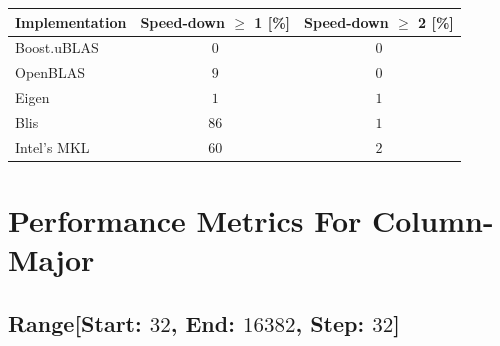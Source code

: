 \begin{table}[ht]
    \begin{tabular}{|l|c|c|}
        \hline
        \textbf{Implementation} & \textbf{Speed-down $\geq$ 1 [\%]} & \textbf{Speed-down $\geq$ 2 [\%]}\\
        \hline
        Boost.uBLAS & $0$ & $0$ \\
        \hline
        OpenBLAS    & $9$ & $0$ \\
        \hline
        Eigen       & $1$ & $1$ \\
        \hline
        Blis        & $86$ & $1$ \\
        \hline
        Intel's MKL & $60$ & $2$ \\
        \hline
    \end{tabular}
\end{table}

\clearpage
\section{Performance Metrics For Column-Major}

\subsection*{Range[Start: $32$, End: $16382$, Step: $32$]}

